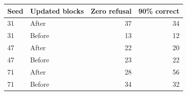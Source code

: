 \begin{tabular}{llrr}
\toprule
Seed & Updated blocks & Zero refusal & 90\% correct \\
\midrule
31 & After & 37 & 34 \\
31 & Before & 13 & 12 \\
47 & After & 22 & 20 \\
47 & Before & 23 & 22 \\
71 & After & 28 & 56 \\
71 & Before & 34 & 32 \\
\bottomrule
\end{tabular}
